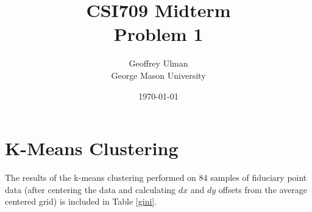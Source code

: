 \documentclass[12pt]{article}
\begin{document}
\title{CSI709 Midterm \\
Problem 1}
\author{
        Geoffrey Ulman \\
        George Mason University\\
}
\date{\today}

\maketitle

\section{K-Means Clustering}

The results of the k-means clustering performed on 84 samples of fiduciary point data (after centering the data and calculating \(dx\) and \(dy\) offsets from the average centered grid) is included in Table \ref{gini}.
\end{document}
